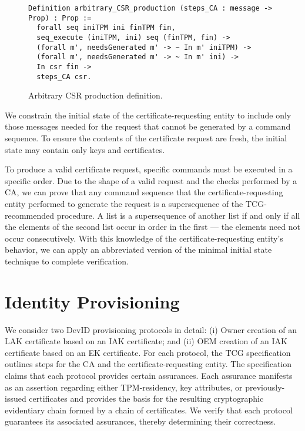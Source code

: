 \documentclass[runningheads]{llncs}
\begin{document}

\begin{figure}[hbtp]
  \begin{lstlisting}[language=Coq]
Definition arbitrary_CSR_production (steps_CA : message -> Prop) : Prop :=
  forall seq iniTPM ini finTPM fin,
  seq_execute (iniTPM, ini) seq (finTPM, fin) ->
  (forall m', needsGenerated m' -> ~ In m' iniTPM) ->
  (forall m', needsGenerated m' -> ~ In m' ini) ->
  In csr fin ->
  steps_CA csr.
  \end{lstlisting}
  \caption{Arbitrary CSR production definition.}
  \label{fig:csr-production}
\end{figure}

We constrain the initial state of the certificate-requesting entity to
include only those messages needed for the request that cannot be
generated by a command sequence.  To ensure the contents of
the certificate request are fresh, the initial state may contain only
keys and certificates.

To produce a valid certificate request, specific commands
must be executed in a specific order.  Due to the shape of a valid
request and the checks performed by a CA, we can prove that any
command sequence that the certificate-requesting entity performed to
generate the request is a supersequence of the TCG-recommended procedure. 
A list is a supersequence of another list if and only if all the elements 
of the second list occur in order in the first --- the elements need not
occur consecutively.  With this knowledge of the
certificate-requesting entity's behavior, we can apply an abbreviated
version of the minimal initial state technique to complete
verification.

\section{Identity Provisioning}

We consider two DevID provisioning protocols in detail: (i) Owner
creation of an LAK certificate based on an IAK certificate; and (ii)
OEM creation of an IAK certificate based on an EK certificate. For
each protocol, the TCG specification outlines steps for the CA and the
certificate-requesting entity. The specification claims that each
protocol provides certain assurances. Each assurance manifests as
an assertion regarding either TPM-residency, key attributes, or
previously-issued certificates and provides the basis for the
resulting cryptographic evidentiary chain formed by a chain of
certificates. We verify that each protocol guarantees its associated
assurances, thereby determining their correctness.
\end{document}

